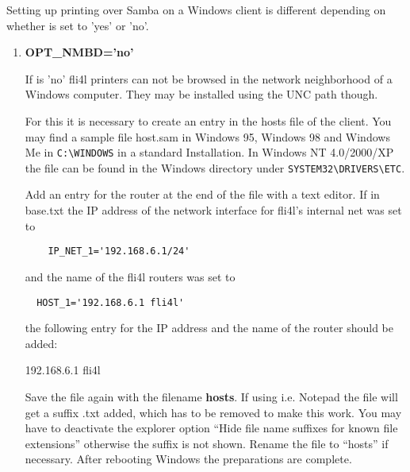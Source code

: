   Setting up printing over Samba on a Windows client is different depending
  on whether  is set to 'yes' or 'no'.

\begin{enumerate}
\item \textbf{OPT\_NMBD='no'}

  If  is 'no' fli4l printers can not be
  browsed in the network neighborhood of a Windows computer. They may be installed
  using the UNC path though.

  For this it is necessary to create an entry in the hosts file of the client.
  You may find a sample file host.sam in Windows 95, Windows 98 and Windows Me
  in \verb+C:\WINDOWS+ in a standard Installation. In Windows NT 4.0/2000/XP
  the file can be found in the Windows directory under \verb+SYSTEM32\DRIVERS\ETC+.

  Add an entry for the router at the end of the file with a text editor.
  If in base.txt the IP address of the network interface for fli4l's internal
  net was set to

\begin{example}
\begin{verbatim}
    IP_NET_1='192.168.6.1/24'
\end{verbatim}
\end{example}

  and the name of the fli4l routers was set to

\begin{example}
\begin{verbatim}
  HOST_1='192.168.6.1 fli4l'
\end{verbatim}
\end{example}

  the following entry for the IP address and the name of the router should be added:

  192.168.6.1     fli4l

  Save the file again with the filename \textbf{hosts}. If using i.e. Notepad the
  file will get a suffix .txt added, which has to be removed to make this work.
  You may have to deactivate the explorer option ``Hide file name suffixes for
  known file extensions'' otherwise the suffix is not shown. Rename the file
  to ``hosts'' if necessary. After rebooting Windows the preparations are complete.


\end{enumerate}
